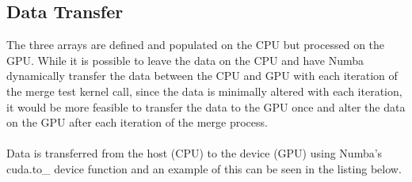 \subsection{Data Transfer}
The three arrays are defined and populated on the CPU but processed on the GPU. While it is possible to leave the data on the CPU and have Numba dynamically transfer the data between the CPU and GPU with each iteration of the merge test kernel call, since the data is minimally altered with each iteration, it would be more feasible to transfer the data to the GPU once and alter the data on the GPU after each iteration of the merge process.
\\
\\
Data is transferred from the host (CPU) to the device (GPU) using Numba's cuda.to\_ device function and an example of this can be seen in the listing below.